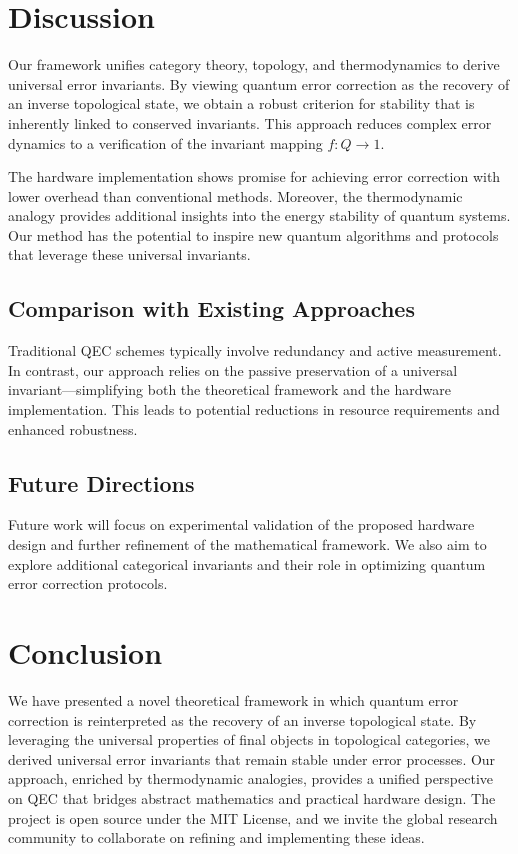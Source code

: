 \documentclass[11pt]{article}
\begin{document}
\section{Discussion}
\label{sec:discussion}
Our framework unifies category theory, topology, and thermodynamics to derive universal error invariants. By viewing quantum error correction as the recovery of an inverse topological state, we obtain a robust criterion for stability that is inherently linked to conserved invariants. This approach reduces complex error dynamics to a verification of the invariant mapping \(f: Q \to 1\).

The hardware implementation shows promise for achieving error correction with lower overhead than conventional methods. Moreover, the thermodynamic analogy provides additional insights into the energy stability of quantum systems. Our method has the potential to inspire new quantum algorithms and protocols that leverage these universal invariants.

\subsection{Comparison with Existing Approaches}
Traditional QEC schemes typically involve redundancy and active measurement. In contrast, our approach relies on the passive preservation of a universal invariant—simplifying both the theoretical framework and the hardware implementation. This leads to potential reductions in resource requirements and enhanced robustness.

\subsection{Future Directions}
Future work will focus on experimental validation of the proposed hardware design and further refinement of the mathematical framework. We also aim to explore additional categorical invariants and their role in optimizing quantum error correction protocols.

\section{Conclusion}
\label{sec:conclusion}
We have presented a novel theoretical framework in which quantum error correction is reinterpreted as the recovery of an inverse topological state. By leveraging the universal properties of final objects in topological categories, we derived universal error invariants that remain stable under error processes. Our approach, enriched by thermodynamic analogies, provides a unified perspective on QEC that bridges abstract mathematics and practical hardware design. The project is open source under the MIT License, and we invite the global research community to collaborate on refining and implementing these ideas.
\end{document}
